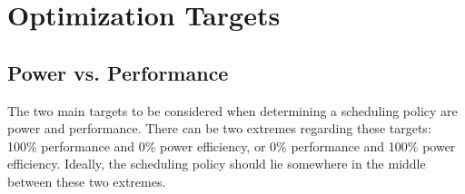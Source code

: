 \section{Optimization Targets}
\subsection{Power vs. Performance}
The two main targets to be considered when determining a scheduling policy are power and performance. There can be two extremes regarding these targets: 100\% performance and 0\% power efficiency, or 0\% performance and 100\% power efficiency. Ideally, the scheduling policy should lie somewhere in the middle between these two extremes.\cite{AAP2013}